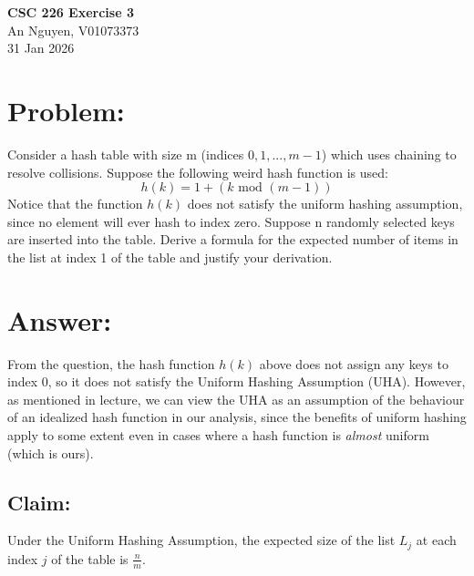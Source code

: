 \documentclass[12pt, b5paper]{article}
\begin{document}
\begin{center}
{\bf CSC 226
Exercise 3}\\
An Nguyen, V01073373\\
31 Jan 2026
\end{center}

\section*{Problem:}
Consider a hash table with size m (indices  $0, 1, ..., m-1$) which uses 
chaining to resolve collisions. Suppose the following weird hash function 
is used:
$$ h(k) =  1 + (k\text{ mod }(m-1)) $$
Notice that the function $h(k)$ does not satisfy the uniform hashing 
assumption, since no element will ever hash to index zero. Suppose n randomly 
selected keys are inserted into the table. Derive a formula for the expected 
number of items in the list at index 1 of the table and justify your derivation. 


\section*{Answer:}
From the question, the hash function $h(k)$ above does not assign any keys to index $0$,
so it does not satisfy the Uniform Hashing Assumption (UHA). However, as mentioned in lecture,
we can view the UHA as an assumption of the behaviour of an idealized hash function in our analysis, since the 
benefits of uniform hashing apply to some extent even in cases where a hash function is 
\textit{almost} uniform (which is ours).
\subsection*{Claim:} Under the Uniform Hashing Assumption, the expected size of the list $L_j$ at each 
index $j$ of the table is $\frac{n}{m}$.
\end{document}
